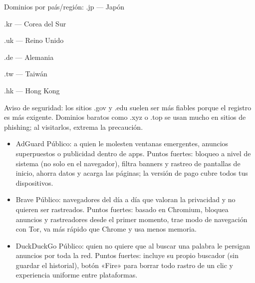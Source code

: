 Dominios por país/región: .jp — Japón

.kr — Corea del Sur

.uk — Reino Unido

.de — Alemania

.tw — Taiwán

.hk — Hong Kong

Aviso de seguridad: los sitios .gov y .edu suelen ser más fiables porque el registro es más exigente. Dominios baratos como .xyz o .top se usan mucho en sitios de phishing; al visitarlos, extrema la precaución.


\begin{itemize}
  \item AdGuard Público: a quien le molesten ventanas emergentes, anuncios superpuestos o publicidad dentro de apps. Puntos fuertes: bloqueo a nivel de sistema (no solo en el navegador), filtra banners y rastreo de pantallas de inicio, ahorra datos y acarga las páginas; la versión de pago cubre todos tus dispositivos.
\end{itemize}


\begin{itemize}
  \item Brave Público: navegadores del día a día que valoran la privacidad y no quieren ser rastreados. Puntos fuertes: basado en Chromium, bloquea anuncios y rastreadores desde el primer momento, trae modo de navegación con Tor, va más rápido que Chrome y usa menos memoria.
  \item DuckDuckGo Público: quien no quiere que al buscar una palabra le persigan anuncios por toda la red. Puntos fuertes: incluye su propio buscador (sin guardar el historial), botón «Fire» para borrar todo rastro de un clic y experiencia uniforme entre plataformas.
\end{itemize}


